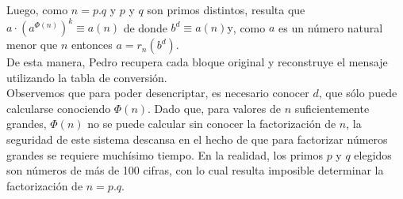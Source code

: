 \documentclass[10pt]{article}
\begin{document}
Luego, como $n=p . q$ y $p$ y $q$ son primos distintos, resulta que $a \cdot\left(a^{\Phi(n)}\right)^{k} \equiv a(n)$ de donde $b^{d} \equiv a(n) \mathrm{y}$, como $a$ es un número natural menor que $n$ entonces $a=r_{n}\left(b^{d}\right)$.\\
De esta manera, Pedro recupera cada bloque original y reconstruye el mensaje utilizando la tabla de conversión.\\
Observemos que para poder desencriptar, es necesario conocer $d$, que sólo puede calcularse conociendo $\Phi(n)$. Dado que, para valores de $n$ suficientemente grandes, $\Phi(n)$ no se puede calcular sin conocer la factorización de $n$, la seguridad de este sistema descansa en el hecho de que para factorizar números grandes se requiere muchísimo tiempo. En la realidad, los primos $p$ y $q$ elegidos son números de más de 100 cifras, con lo cual resulta imposible determinar la factorización de $n=p . q$.
\end{document}
